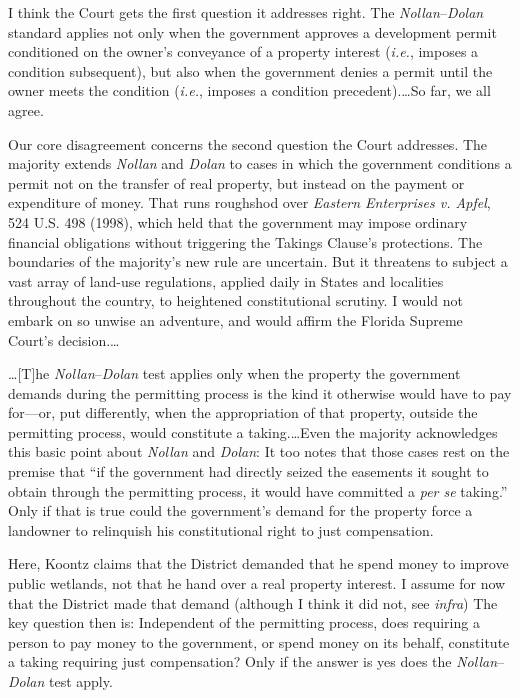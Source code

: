 I think the Court gets the first question it addresses right. The
\textit{Nollan}--\textit{Dolan} standard applies not only when the government
approves a development permit conditioned on the owner's conveyance of a
property interest (\textit{i.e.}, imposes a condition subsequent), but also when
the government denies a permit until the owner meets the condition
(\textit{i.e.}, imposes a condition precedent).\ldots So far, we all agree.

Our core disagreement concerns the second question the Court addresses. The
majority extends \textit{Nollan} and \textit{Dolan} to cases in which the
government conditions a permit not on the transfer of real property, but instead
on the payment or expenditure of money. That runs roughshod over \textit{Eastern
Enterprises v. Apfel}, 524 U.S. 498 (1998), which held that the government may
impose ordinary financial obligations without triggering the Takings Clause's
protections. The boundaries of the majority's new rule are uncertain. But it
threatens to subject a vast array of land-use regulations, applied daily in
States and localities throughout the country, to heightened constitutional
scrutiny. I would not embark on so unwise an adventure, and would affirm the
Florida Supreme Court's decision.\ldots



\ldots [T]he \textit{Nollan}--\textit{Dolan} test applies only when the property
the government demands during the permitting process is the kind it otherwise
would have to pay for---or, put differently, when the appropriation of that
property, outside the permitting process, would constitute a taking.\ldots Even
the majority acknowledges this basic point about \textit{Nollan} and
\textit{Dolan}: It too notes that those cases rest on the premise that ``if the
government had directly seized the easements it sought to obtain through the
permitting process, it would have committed a \textit{per se} taking.'' Only if
that is true could the government's demand for the property force a landowner to
relinquish his constitutional right to just compensation.

Here, Koontz claims that the District demanded that he spend money to improve
public wetlands, not that he hand over a real property interest. I assume for
now that the District made that demand (although I think it did not, see
\textit{infra}) The key question then is: Independent of the permitting process,
does requiring a person to pay money to the government, or spend money on its
behalf, constitute a taking requiring just compensation? Only if the answer is
yes does the \textit{Nollan}--\textit{Dolan} test apply.

